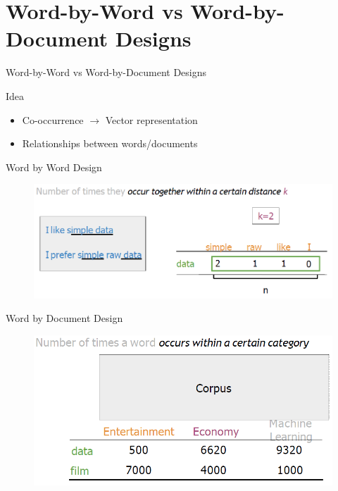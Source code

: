 \section{Word-by-Word vs Word-by-Document Designs}
\begin{frame}{}
    \LARGE Word-by-Word vs Word-by-Document Designs
\end{frame}

\begin{frame}{Idea}
    \begin{itemize}
        \item Co-occurrence $\rightarrow$ Vector representation
        \item Relationships between words/documents
    \end{itemize}
\end{frame}

\begin{frame}{Word by Word Design}
    \begin{figure}
        \centering
        \includegraphics[width=\textwidth,height=0.8\textheight,keepaspectratio]{images/vector-space/word-by-word-design.png}
    \end{figure}
\end{frame}

\begin{frame}{Word by Document Design}
    \begin{figure}
        \centering
        \includegraphics[width=\textwidth,height=0.8\textheight,keepaspectratio]{images/vector-space/word-by-doc-design.png}
    \end{figure}
\end{frame}

